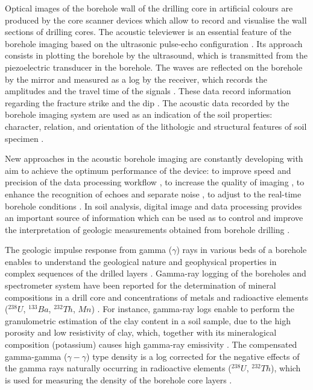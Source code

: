 \documentclass[USenglish,twocolumn]{article}
\begin{document}
Optical images of the borehole wall of the drilling core in artificial colours are produced by the core scanner devices which allow to record and visualise the wall sections of drilling cores. The acoustic televiewer is an essential feature of the borehole imaging based on the ultrasonic pulse-echo configuration \cite{paillet1990borehole}. Its approach consists in plotting the borehole by the ultrasound, which is transmitted from the piezoelectric transducer in the borehole. The waves are reflected on the borehole by the mirror and measured as a log by the receiver, which records the amplitudes and the travel time of the signals \cite{RONQUILLOJARILLO20181}. These data record information regarding the fracture strike and the dip \cite{Paillet}. The acoustic data recorded by the borehole imaging system are used as an indication of the soil properties: character, relation, and orientation of the lithologic and structural features of soil specimen \cite{WILLIAMS2004151}. 

New approaches in the acoustic borehole imaging are constantly developing with aim to achieve the optimum performance of the device: to improve speed and precision of the data processing workflow \cite{schepers1991development,DELTOMBE2004161}, to increase the quality of imaging \cite{ALSIT2015139}, to enhance the recognition of echoes and separate noise \cite{WEDGE2017157}, to adjust to the real-time borehole conditions \cite{Jerram}. In soil analysis, digital image and data processing provides an important source of information which can be used as to control and improve the interpretation of geologic measurements obtained from borehole drilling \cite{Kaellenetal2014,Kallenetal2016,Lindh_Lemenkova_2023}.

The geologic impulse response from gamma ($\gamma$) rays in various beds of a borehole enables to understand the geological nature and geophysical properties in complex sequences of the drilled layers \cite{Conaway}. Gamma-ray logging of the boreholes and spectrometer system have been reported for the determination of mineral compositions in a drill core \cite{Ajayi} and concentrations of metals and radioactive elements ($^{238}U$, $^{133}Ba$, $^{232}Th$, $Mn$) \cite{Loevborg,Mikesell}. For instance, gamma-ray logs enable to perform the granulometric estimation of the clay content in a soil sample, due to the high porosity and low resistivity of clay, which, together with its mineralogical composition (potassium) causes high gamma-ray emissivity \cite{Bhuyan,DIAZCURIEL2021104481}. The compensated gamma-gamma ($\gamma-\gamma$) type density is a log corrected for the negative effects of the gamma rays naturally occurring in radioactive elements ($^{238}U$, $^{232}Th$), which is used for measuring the density of the borehole core layers \cite{osti_5961810,osti_5614551}.
\end{document}
